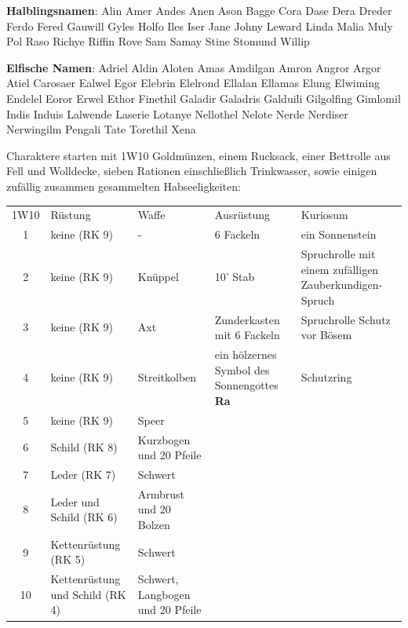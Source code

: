 \documentclass[11pt]{wbzine}
\begin{document}
\begin{multicols}{2}
\textbf{Halblingsnamen}:
Alin
Amer
Andes
Anen
Ason
Bagge
Cora
Dase
Dera
Dreder
Ferdo
Fered
Gauwill
Gyles
Holfo
Iles
Iser
Jane
Johny
Leward
Linda
Malia
Muly
Pol
Raso
Richye
Riffin
Rove
Sam
Samay
Stine
Stomund
Willip

\textbf{Elfische Namen}:
Adriel
Aldin
Aloten
Amas
Amdilgan
Amron
Angror
Argor
Atiel
Carosaer
Ealwel
Egor
Elebrin
Elelrond
Ellalan
Ellamas
Elung
Elwiming
Endelel
Eoror
Erwel
Ethor
Finethil
Galadir
Galadris
Galduili
Gilgolfing
Gimlomil
Indis
Induis
Lalwende
Laserie
Lotanye
Nellothel
Nelote
Nerde
Nerdiser
Nerwingilm
Pengali
Tate
Torethil
Xena

Charaktere starten mit 1W10 Goldmünzen, einem Rucksack, einer
Bettrolle aus Fell und Wolldecke, sieben Rationen einschließlich
Trinkwasser, sowie einigen zufällig zusammen gesammelten
Habseeligkeiten:

\end{multicols}
\begin{tabularx}{\textwidth}{cZZZZ}
    1W10 & Rüstung & Waffe & Ausrüstung & Kuriosum \\
1 &
    keine (RK 9) &
    - &
    6 Fackeln &
    ein Sonnenstein \\

2 &
 keine (RK 9) &
    Knüppel &
    10' Stab &
    Spruchrolle mit einem 
    zufälligen Zauberkundigen-Spruch\\

3 &
 keine (RK 9) &
   Axt &
  Zunderkasten mit 6 Fackeln &
  Spruchrolle Schutz vor Bösem \\

4 &
 keine (RK 9) &
 Streitkolben &
 ein hölzernes Symbol des Sonnengottes \textbf{Ra} &
 Schutzring \\

5 &
 keine (RK 9) &
 Speer &
 &
\\

6 &
 Schild (RK 8) &
 Kurzbogen und 20 Pfeile & 
&
\\

7 &
 Leder (RK 7) &
 Schwert &
&
\\

8 &
 Leder und Schild (RK 6) &
 Armbrust und 20 Bolzen &
 &
\\

9 &
 Kettenrüstung (RK 5) &
 Schwert &
 &
\\

10 &
 Kettenrüstung und Schild (RK 4) &
 Schwert, Langbogen und 20 Pfeile &
 &
\\

\end{tabularx}
\end{document}
